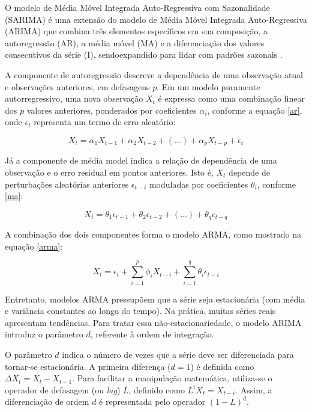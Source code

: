 O modelo de Média Móvel Integrada Auto-Regressiva com Sazonalidade (SARIMA) é uma extensão do modelo de Média Móvel
Integrada Auto-Regressiva (ARIMA) que combina três elementos específicos em sua composição, a autoregressão (AR), a
média móvel (MA) e a diferenciação dos valores consecutivos da série (I), sendoexpandido para lidar com padrões sazonais
\cite{box}.

A componente de autoregressão descreve a dependência de uma observação atual e observações anteriores, em defasagens
$p$. Em um modelo puramente autorregressivo, uma nova observação $X_t$ é expressa como uma combinação linear dos $p$
valores anteriores, ponderados por coeficientes $\alpha_i$, conforme a equação \autoref{ar}, onde $\epsilon_t$
representa um termo de erro aleatório:

\begin{equation}
    \label{ar}
    X_t=\alpha_1X_{t-1} + \alpha_2X_{t-2} +(...) + \alpha_pX_{t-p} + \epsilon_t
\end{equation}

Já a componente de média model indica a relação de dependência de uma observação e o erro residual em pontos anteriores.
Isto é, $X_t$ depende de perturbações aleatórias anteriores $\epsilon_{t-i}$ moduladas por coeficientes $\theta_i$,
conforme \autoref{ma}:

\begin{equation}
    \label{ma}
    X_t=\theta_1\epsilon_{t-1} + \theta_2\epsilon_{t-2} + (...) + \theta_q\epsilon_{t-q}
\end{equation}

A combinação dos dois componentes forma o modelo ARMA, como mostrado na equação \autoref{arma}:

\begin{equation}
    \label{arma}
    X_t = \epsilon_t + \sum_{i=1}^{p}\phi_i X_{t-i} + \sum_{i=1}^q \theta_i \epsilon_{t-i}
\end{equation}

Entretanto, modelos ARMA pressupõem que a série seja estacionária (com média e variância constantes ao longo do
tempo). Na prática, muitas séries reais apresentam tendências. Para tratar essa não-estacionariedade, o modelo ARIMA
introduz o parâmetro $d$, referente à ordem de integração.

O parâmetro $d$ indica o número de vezes que a série deve ser diferenciada para tornar-se estacionária. A primeira
diferença ($d=1$) é definida como $\Delta X_t = X_t - X_{t-1}$. Para facilitar a manipulação matemática, utiliza-se o
operador de defasagem (ou \textit{lag}) $L$, definido como $L^i X_t = X_{t-i}$. Assim, a diferenciação de ordem $d$ é
representada pelo operador $(1 - L)^d$.

